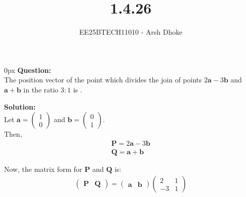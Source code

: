 \documentclass[journal]{IEEEtran}
\renewcommand{\vec}[1]{\mathbf{#1}}
\newcommand{\solution}{\textbf{Solution: }}
\newcommand{\brak}[1]{\begin{pmatrix}#1\end{pmatrix}}
\begin{document}

\vspace{3cm}

\title{1.4.26}
\author{EE25BTECH11010 - Arsh Dhoke}
{\let\newpage\relax\maketitle}

\renewcommand{\thefigure}{\theenumi}
\renewcommand{\thetable}{\theenumi}
\setlength{\intextsep}{10pt}

\parindent 0px
\textbf{Question:} \\
The position vector of the point which divides the join of points $2\vec{a} - 3\vec{b}$ and $\vec{a} + \vec{b}$ in the ratio $3:1$ is \underline{\hspace{2cm}}.

\solution \\

Let $\vec{a}=\brak{1\\0}$ and $\vec{b}=\brak{0\\1}$.\\
Then,
\begin{align}
    \vec{P}=2\vec{a}-3\vec{b}\\
    \vec{Q}=\vec{a}+\vec{b}
\end{align}

Now, the matrix form for \( \vec{P} \) and \( \vec{Q} \) is:
\begin{align}
\begin{pmatrix}
\vec{P} & \vec{Q}
\end{pmatrix}
= \begin{pmatrix}
\vec{a} & \vec{b}
\end{pmatrix}
\begin{pmatrix}
2 & 1 \\
-3 & 1
\end{pmatrix}
\end{align}
\end{document}
